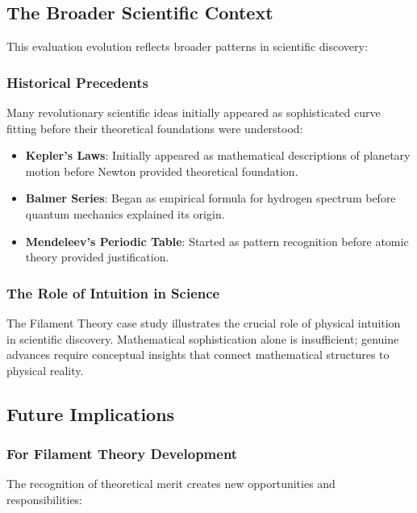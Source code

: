\subsection{The Broader Scientific Context}

This evaluation evolution reflects broader patterns in scientific discovery:

\subsubsection{Historical Precedents}

Many revolutionary scientific ideas initially appeared as sophisticated curve fitting before their theoretical foundations were understood:

\begin{itemize}
\item \textbf{Kepler's Laws}: Initially appeared as mathematical descriptions of planetary motion before Newton provided theoretical foundation.
\item \textbf{Balmer Series}: Began as empirical formula for hydrogen spectrum before quantum mechanics explained its origin.
\item \textbf{Mendeleev's Periodic Table}: Started as pattern recognition before atomic theory provided justification.
\end{itemize}

\subsubsection{The Role of Intuition in Science}

The Filament Theory case study illustrates the crucial role of physical intuition in scientific discovery. Mathematical sophistication alone is insufficient; genuine advances require conceptual insights that connect mathematical structures to physical reality.

\subsection{Future Implications}

\subsubsection{For Filament Theory Development}

The recognition of theoretical merit creates new opportunities and responsibilities:


